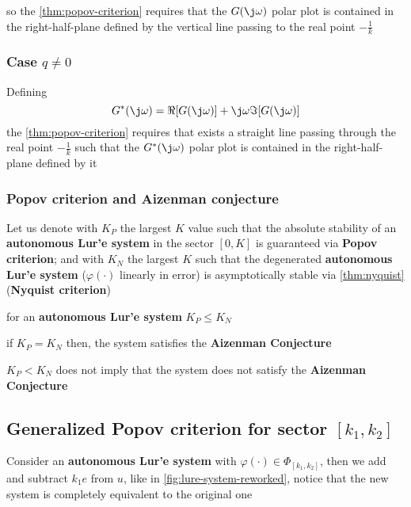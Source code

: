 so the \cref{thm:popov-criterion} requires that the $G(\j\omega)$ polar plot is contained in the right-half-plane defined by the vertical line passing to the real point $-\frac{1}{k}$

\subsubsection{Case $q \neq 0$}

\begin{corollary}
    Defining
    \[
        G^*(\j\omega) = \Re[G(\j\omega)] + \j\omega \Im[G(\j\omega)]
    \]
    the \cref{thm:popov-criterion} requires that exists a straight line passing through the real point $-\frac{1}{k}$ such that the $G^*(\j\omega)$ polar plot is contained in the right-half-plane defined by it
\end{corollary}

\subsubsection{Popov criterion and Aizenman conjecture}

Let us denote with $K_P$ the largest $K$ value such that the absolute stability of an \textbf{autonomous Lur'e system} in the sector $[0,K]$ is guaranteed via \textbf{Popov criterion};
and with $K_N$ the largest $K$ such that the degenerated \textbf{autonomous Lur'e system} ($\varphi(\cdot)$ linearly in error) is asymptotically stable via \cref{thm:nyquist}(\textbf{Nyquist criterion})

\begin{nb} for an \textbf{autonomous Lur'e system} $K_P \leq K_N$\end{nb}

\begin{nb}if $K_P = K_N$ then, the system satisfies the \textbf{Aizenman Conjecture} \end{nb}

\begin{nb}$K_P < K_N$ does not imply that the system does not satisfy the \textbf{Aizenman Conjecture}\end{nb}

\subsection{Generalized Popov criterion for sector $[k_1,k_2]$}

Consider an \textbf{autonomous Lur'e system} with $\varphi(\cdot) \in \Phi_{[k_1,k_2]}$, then we add and subtract $k_1 e$ from $u$, like in \cref{fig:lure-system-reworked}, notice that the new system is completely equivalent to the original one

